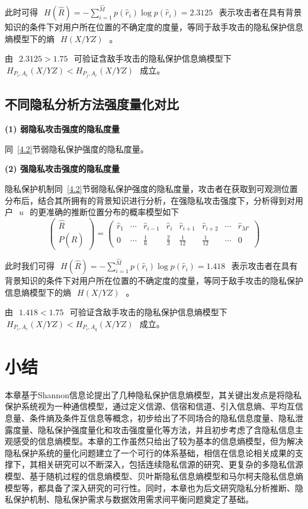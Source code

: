 此时可得~$~H(\hat{R})=-\sum_{i=1}^{\hat{M}}p(\hat{r}_{i})\log p(\hat{r}_{i})=2.3125~$~表示攻击者在具有背景知识的条件下对用户所在位置的不确定度的度量，等同于敌手攻击的隐私保护信息熵模型下的熵~$~H(X/YZ)~$~。

由~$~2.3125>1.75~$~可验证含敌手攻击的隐私保护信息熵模型下~$~H_{P_{i},A_{r}}(X/YZ)<H_{P_{j},A_{r}}(X/YZ)~$~成立。

\subsection{不同隐私分析方法强度量化对比}

\textbf{(1) 弱隐私攻击强度的隐私度量}

同~\ref{4.2}节弱隐私保护强度的隐私度量。

\textbf{(2) 强隐私攻击强度的隐私度量}

隐私保护机制同~\ref{4.2}节弱隐私保护强度的隐私度量，攻击者在获取到可观测位置分布后，结合其所拥有的背景知识进行分析，在强隐私攻击强度下，分析得到对用户~$~u~$~的更准确的推断位置分布的概率模型如下
\begin{equation}
\begin{pmatrix}
\hat{R}\\ 
P(\hat{R})
\end{pmatrix}=\begin{pmatrix}
\hat{r}_{1} & \cdots & \hat{r}_{i-1}  & \hat{r}_{i} & \hat{r}_{i+1} & \hat{r}_{i+2} & \cdots  & \hat{r}_{{M}'}\\ 
0 & \cdots  & \frac{1}{6} & \frac{2}{3} & \frac{1}{12} & \frac{1}{12} & \cdots  & 0
\end{pmatrix}
\end{equation}

此时我们可得~$~H(\hat{R})=-\sum_{i=1}^{\hat{M}}p(\hat{r}_{i})\log p(\hat{r}_{i})=1.418~$~表示攻击者在具有背景知识的条件下对用户所在位置的不确定度的度量，等同于敌手攻击的隐私保护信息熵模型下的熵~$~H(X/YZ)~$~。

由~$~1.418<1.75~$~可验证含敌手攻击的隐私保护信息熵模型下~$~H_{P_{i},A_{r}}(X/YZ)<H_{P_{i},A_{q}}(X/YZ)~$~成立。

\section{小结}\label{sconclusion}

本章基于Shannon信息论提出了几种隐私保护信息熵模型，其关键出发点是将隐私保护系统视为一种通信模型，通过定义信源、信宿和信道、引入信息熵、平均互信息量、条件熵及条件互信息等概念，初步给出了不同场合的隐私信息度量、隐私泄露度量、隐私保护强度量化和攻击强度量化等方法，并且初步考虑了含隐私信息主观感受的信息熵模型。本章的工作虽然只给出了较为基本的信息熵模型，但为解决隐私保护系统的量化问题建立了一个可行的体系基础，相信在信息论相关成果的支撑下，其相关研究可以不断深入，包括连续隐私信源的研究、更复杂的多隐私信源模型、基于随机过程的信息熵模型、贝叶斯隐私信息熵模型和马尔柯夫隐私信息熵模型等，都具备了深入研究的可行性。同时，本章也为后文研究隐私分析推断、隐私保护机制、隐私保护需求与数据效用需求间平衡问题奠定了基础。












